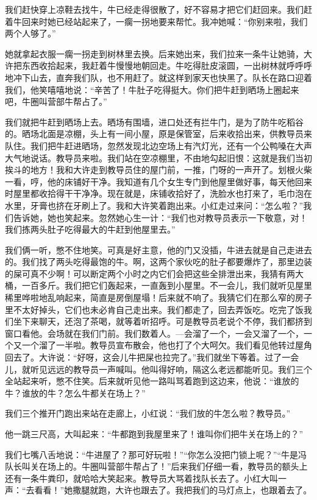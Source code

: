 我们赶快穿上凉鞋去找牛，牛已经走得很散了，好不容易才把它们赶回来。我们赶着牛回来时她已经站起来了，一瘸一拐地要来帮忙。我冲她喊：“你别来啦，我们两个人够了。” 

她就拿起衣服一瘸一拐走到树林里去换。后来她出来，我们拉来一条牛让她骑，大许把东西收拾起来，我赶着牛慢慢地朝回走。牛吃得肚皮滚圆，一出树林就呼呼呼地冲下山去，直奔我们队，也不用赶了。就这样到家天也快黑了。队长在路口迎着我们，他笑嘻嘻地说：“辛苦了！牛肚子吃得挺大。你们把牛赶到晒场上圈起来吧，牛圈叫营部牛帮占了。” 

我们就把牛赶到晒场上去。晒场有围墙，进口处还有拦牛门，是为了防牛吃稻谷的。晒场北面是凉棚，头上有一间小屋，原是保管室，后来收拾出来，供教导员来队住。我们把牛赶进晒场，忽然发现北边空场上有汽灯光，还有一个公鸭嗓在大声大气地说话。教导员来啦。我们站在空凉棚里，不由地勾起旧恨：这就是我们当初挨斗的地方！我和大许走到教导员住的屋门前，一推，门呀的一声开了。划根火柴一看，哼，他的床铺好干净。我知道有几个女生专门到他屋里做好事，每天他回来时屋里都收拾得干干净净。现在就是，床铺收拾好了，洗脸水也打来了，毛巾泡在水里，牙膏也挤在牙刷上了。我和大许笑着跑出来。小红走过来问：“怎么啦？”我们告诉她，她也笑起来。忽然她心生一计：“我们也对教导员表示一下敬意，对！我们拣两头肚子吃得最大的牛赶到他屋里去。” 

我们俩一听，憋不住地笑。可真是好主意，他的门又没插，牛进去就是自己走进去的。我们找了两头吃得最饱的牛。啊，这两个家伙吃的肚子都要爆炸了，那里边装的屎可真不少啊！可以断定两个小时之内它们会把这些全排泄出来，我猜有两大桶，一百多斤。我们把它们轰起来，一直轰到小屋里。不一会儿，我们就听见屋里稀里哗啦地乱响起来，简直是房倒屋塌！后来就不响了。我猜它们在那么窄的房子里不太好掉头，它们也未必肯自己走出来。我们都走了，回去弄饭吃。吃完了饭我们坐下来聊天，还泡了茶喝，就等着听招呼。可是教导员老说个不停，我们都挤到窗口看他。会场就在我们门前。我们数着人。—会溜了一个，一会又溜了一个，一个又一个溜了一半啦。教导员宣布散会，他也打了个大呵欠。我们看见他转过屋角回去了。大许说：“好呀，这会儿牛把屎也拉完了。”我们就坐下等着。过了一会儿，就听见远远的教导员一声喊叫。他叫得好响，隔这么老远都能听见。我们三个全站起来听，憋不住笑。后来就听见他一路叫骂着跑到这边来，他说：“谁放的牛？谁放的牛？怎么牛都关在场上？” 

我们三个推开门跑出来站在走廊上，小红说：“我们放的牛怎么啦？教导员。” 

他一跳三尺高，大叫起来：“牛都跑到我屋里来了！谁叫你们把牛关在场上的？” 

我们七嘴八舌地说：“牛进屋了？那可好玩啦！”“你怎么没把门锁上呢？”“牛是冯队长叫关在场上的。牛圈叫营部牛帮占了！”后来我们仔细一看，教导员的额头上还有一条牛粪印，就哈哈大笑起来。教导员大骂着找队长去了。小红大叫一声：“去看看！”她撒腿就跑，大许也跟去了。我把我们的马灯点上，也跟着去了。 

